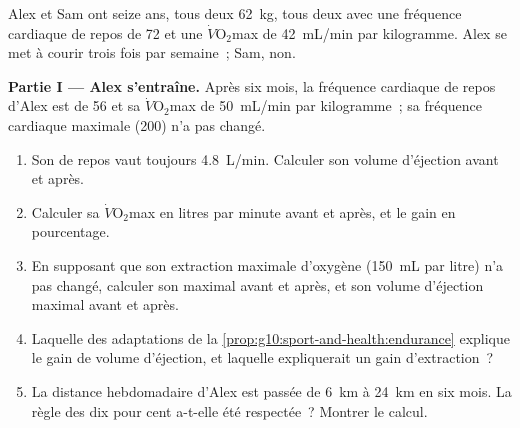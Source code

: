 \begin{problem}
\label{pb:g10:sport-and-health:1}
Alex et Sam ont seize ans, tous deux \qty{62}{kg}, tous deux avec une
fréquence cardiaque de repos de 72 et une $\dot V\!\mathrm{O_2}$max de
\qty{42}{mL/min} par kilogramme. Alex se met à courir trois fois par
semaine~; Sam, non.

\medskip
\noindent\textbf{Partie I --- Alex s'entraîne.}
Après six mois, la fréquence cardiaque de repos d'Alex est de 56 et sa
$\dot V\!\mathrm{O_2}$max de \qty{50}{mL/min} par kilogramme~; sa
fréquence cardiaque maximale (200) n'a pas changé.
\begin{enumerate}
  \item Son  de repos vaut toujours \qty{4.8}{L/min}.
        Calculer son volume d'éjection avant et après.
  \item Calculer sa $\dot V\!\mathrm{O_2}$max en litres par minute
        avant et après, et le gain en pourcentage.
  \item En supposant que son extraction maximale d'oxygène
        (\qty{150}{mL} par litre) n'a pas changé, calculer son  maximal avant et après, et son volume d'éjection
        maximal avant et après.
  \item Laquelle des adaptations de la
        \cref{prop:g10:sport-and-health:endurance} explique le gain de
        volume d'éjection, et laquelle expliquerait un gain
        d'extraction~?
  \item La distance hebdomadaire d'Alex est passée de \qty{6}{km} à
        \qty{24}{km} en six mois. La règle des dix pour cent a-t-elle
        été respectée~? Montrer le calcul.
\end{enumerate}


\end{problem}
